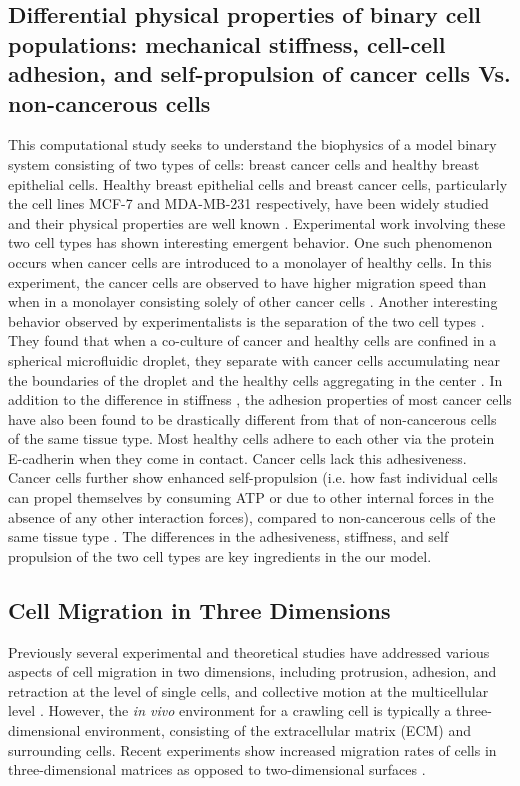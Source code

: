 \documentclass[aps,prb,twocolumn,groupedaddress,nofootinbib,floatfix]{revtex4}
\begin{document}
\subsection{Differential physical properties of binary cell populations: mechanical stiffness, cell-cell adhesion, and self-propulsion of cancer cells Vs. non-cancerous cells}

This computational study seeks to understand the biophysics of a model binary system consisting of two types of cells: breast cancer cells and healthy breast epithelial cells. 
Healthy breast epithelial cells and breast cancer cells, particularly the cell lines MCF-7 and MDA-MB-231 respectively, have been widely studied and their physical properties are well known \cite{Suresh}.
Experimental work involving these two cell types has shown interesting emergent behavior. 
One such phenomenon occurs when cancer cells are introduced to a monolayer of healthy cells.
In this experiment, the cancer cells are observed to have higher migration speed than when in a monolayer consisting solely of other cancer cells \cite{Lee}.
Another interesting behavior observed by experimentalists is the separation of the two cell types \cite{Lu}.
They found that when a co-culture of cancer and healthy cells are confined in a spherical microfluidic droplet, they separate with cancer cells accumulating near the boundaries of the droplet and the healthy cells aggregating in the center \cite{Mingming}.
In addition to the difference in stiffness \cite{Lee}, the adhesion properties of most cancer cells have also been found to be drastically different from that of non-cancerous cells of the same tissue type\cite{Jeanes}.
Most healthy cells adhere to each other via the protein E-cadherin when they come in contact. Cancer cells lack this adhesiveness. Cancer cells further show enhanced self-propulsion (i.e. how fast individual cells can propel themselves by consuming ATP or due to other internal forces in the absence of any other interaction forces), compared to non-cancerous cells of the same tissue type \cite{Suresh}. The differences in the adhesiveness, stiffness, and self propulsion of the two cell types are key ingredients in the our model.


\subsection{Cell Migration in Three Dimensions}

Previously several experimental and theoretical studies have addressed various aspects of cell migration in two dimensions, including protrusion, adhesion, and retraction at the level of single cells, and collective motion at the multicellular level \cite{}.
However, the {\it in vivo} environment for a crawling cell is typically a three-dimensional environment, consisting of the extracellular matrix (ECM) and surrounding cells.
Recent experiments show increased migration rates of cells in three-dimensional matrices as opposed to two-dimensional surfaces \cite{Cukierman}.
\end{document}
